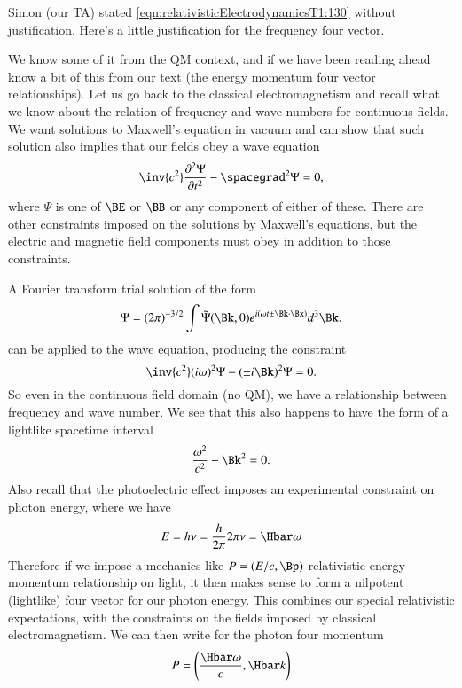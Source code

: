 %
%

Simon (our TA) stated \cref{eqn:relativisticElectrodynamicsT1:130} without justification.  Here's a little justification for the frequency four vector.

We know some of it from the QM context, and if we have been reading ahead know a bit of this from our text \citep{landau1980classical} (the energy momentum four vector relationships).  Let us go back to the classical electromagnetism and recall what we know about the relation of frequency and wave numbers for continuous fields.  We want solutions to Maxwell's equation in vacuum and can show that such solution also implies that our fields obey a wave equation
%
\begin{equation}\label{eqn:relativisticElectrodynamicsT1:131}
\inv{c^2} \frac{\partial^2 \Psi}{\partial t^2} - \spacegrad^2 \Psi = 0,
\end{equation}
%
where \(\Psi\) is one of \(\BE\) or \(\BB\) or any component of either of these.  There are other constraints imposed on the solutions by Maxwell's equations, but the electric and magnetic field components must obey  in addition to those constraints.

A Fourier transform trial solution of the form
%
\begin{equation}\label{eqn:relativisticElectrodynamicsT1:132}
\Psi = (2 \pi)^{-3/2} \int \tilde{\Psi}(\Bk, 0) e^{i (\omega t \pm \Bk \cdot \Bx) } d^3 \Bk.
\end{equation}
%
can be applied to the wave equation, producing the constraint
%
\begin{equation}\label{eqn:relativisticElectrodynamicsT1:133}
\inv{c^2} (i \omega)^2 \Psi - (\pm i \Bk)^2 \Psi = 0.
\end{equation}
%
So even in the continuous field domain (no QM), we have a relationship between frequency and wave number.  We see that this also happens to have the form of a lightlike spacetime interval
%
\begin{equation}\label{eqn:relativisticElectrodynamicsT1:134}
\frac{\omega^2}{c^2} - \Bk^2 = 0.
\end{equation}
%
Also recall that the photoelectric effect imposes an experimental constraint on photon energy, where we have
%
\begin{equation}\label{eqn:relativisticElectrodynamicsT1:135}
E = h \nu = \frac{h}{2\pi} 2 \pi \nu = \Hbar \omega
\end{equation}
%
Therefore if we impose a mechanics like \(P = (E/c, \Bp) \) relativistic energy-momentum relationship on light, it then makes sense to form a nilpotent (lightlike) four vector for our photon energy.  This combines our special relativistic expectations, with the constraints on the fields imposed by classical electromagnetism.  We can then write for the photon four momentum
%
\begin{equation}\label{eqn:relativisticElectrodynamicsT1:136}
P = \left( \frac{\Hbar \omega}{c}, \Hbar k \right)
\end{equation}
%
